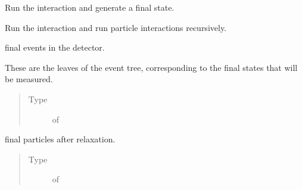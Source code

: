 \documentclass[letterpaper,10pt,english]{sphinxmanual}
\begin{document}
\begin{fulllineitems}
\begin{fulllineitems}
\end{fulllineitems}


\begin{fulllineitems}
\label{\detokenize{code_structure:scdc.event.Event.act}}
Run the interaction and generate a final state.

\end{fulllineitems}


\begin{fulllineitems}
\label{\detokenize{code_structure:scdc.event.Event.chain}}
Run the interaction and run particle interactions recursively.

\end{fulllineitems}


\begin{fulllineitems}
\label{\detokenize{code_structure:scdc.event.Event.leaf_events}}
final events in the detector.

These are the leaves of the event tree, corresponding to the final
states that will be measured.
\begin{quote}\begin{description}
\item[{Type}] \leavevmode
{} of {\hyperref[\detokenize{code_structure:scdc.event.Event}]{}}

\end{description}\end{quote}

\end{fulllineitems}


\begin{fulllineitems}
\label{\detokenize{code_structure:scdc.event.Event.leaf_particles}}
final particles after relaxation.
\begin{quote}\begin{description}
\item[{Type}] \leavevmode
{} of 


\end{description}
\end{quote}
\end{fulllineitems}
\end{fulllineitems}
\end{document}
